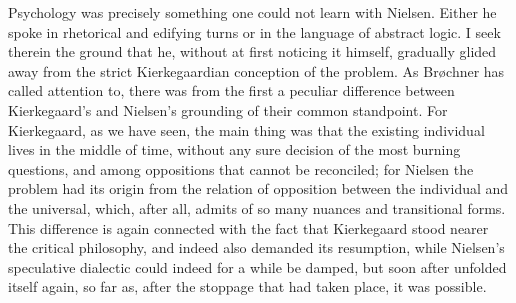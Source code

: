 \documentclass[12pt,a4paper]{book}
\begin{document}
Psychology was precisely something one could not learn with Nielsen. Either he spoke in
rhetorical and edifying turns or in the language of abstract logic. I seek therein the ground
that he, without at first noticing it himself, gradually glided away from the strict
Kierkegaardian conception of the problem. As Brøchner has called attention to, there was from
the first a peculiar difference between Kierkegaard's and Nielsen's grounding of their common
standpoint. For Kierkegaard, as we have seen, the main thing was that the existing individual
lives in the middle of time, without any sure decision of the most burning questions, and among
oppositions that cannot be reconciled; for Nielsen the problem had its origin from the relation
of opposition between the individual and the universal, which, after all, admits of so many
nuances and transitional forms. This difference is again connected with the fact that
Kierkegaard stood nearer the critical philosophy, and indeed also demanded its resumption, while
Nielsen's speculative dialectic could indeed for a while be damped, but soon after unfolded
itself again, so far as, after the stoppage that had taken place, it was possible.
\end{document}
